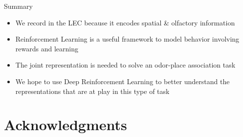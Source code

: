\documentclass[bigger]{beamer}
\begin{document}
\begin{frame}[<+->][label={sec:orgd73df92}]{Summary}
\begin{itemize}
\item We record in the LEC because it encodes spatial \& olfactory information
\item Reinforcement Learning is a useful framework to model behavior involving rewards and learning
\item The joint representation is needed to solve an odor-place association task
\item We hope to use Deep Reinforcement Learning to better understand the representations that are at play in this type of task
\end{itemize}
\end{frame}
\section*{Acknowledgments}
\label{sec:orgceeb156}
\end{document}
